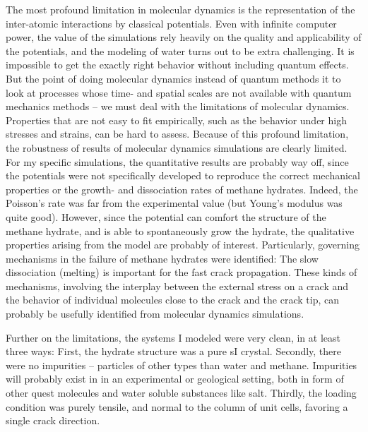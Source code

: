 The most profound limitation in molecular dynamics is the representation of the inter-atomic interactions by classical potentials. Even with infinite computer power, the value of the simulations rely heavily on the quality and applicability of the potentials, and the modeling of water turns out to be extra challenging. It is impossible to get the exactly right behavior without including quantum effects. But the point of doing molecular dynamics instead of quantum methods it to look at processes whose time- and spatial scales are not available with quantum mechanics methods -- we must deal with the limitations of molecular dynamics. Properties that are not easy to fit empirically, such as the behavior under high stresses and strains, can be hard to assess. Because of this profound limitation, the robustness of results of molecular dynamics simulations are clearly limited. For my specific simulations, the quantitative results are probably way off, since the potentials were not specifically developed to reproduce the correct mechanical properties or the growth- and dissociation rates of methane hydrates. Indeed, the Poisson's rate was far from the experimental value (but Young's modulus was quite good). However, since the potential can comfort the structure of the methane hydrate, and is able to spontaneously grow the hydrate, the qualitative properties arising from the model are probably of interest. Particularly, governing mechanisms in the failure of methane hydrates were identified: The slow dissociation (melting) is important for the fast crack propagation. These kinds of mechanisms,  involving the interplay between the external stress on a crack and the behavior of individual molecules close to the crack and the crack tip, can probably be usefully identified from molecular dynamics simulations.

Further on the limitations, the systems I modeled were very clean, in at least three ways: First, the hydrate structure was a pure sI crystal. Secondly, there were no impurities -- particles of other types than water and methane. Impurities will probably exist in in an experimental or geological setting, both in form of other quest molecules and water soluble substances like salt. Thirdly, the loading condition was purely tensile, and normal to the column of unit cells, favoring a single crack direction.

